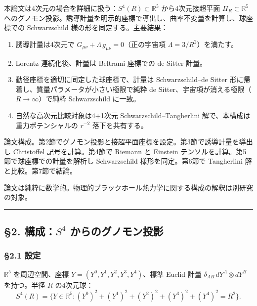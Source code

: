 \documentclass[a4paper,11pt]{ltjsarticle}
\theoremstyle{definition}
\providecommand{\tightlist}{\setlength{\itemsep}{0pt}\setlength{\parskip}{0pt}}
\begin{document}
本論文は4次元の場合を詳細に扱う：\(S^4(R) \subset \mathbb{R}^5\)
から4次元接超平面 \(\Pi_R \subset \mathbb{R}^5\)
へのグノモン投影。誘導計量を明示的座標で導出し、曲率不変量を計算し、球座標での
Schwarzschild 様の形を同定する。主要結果：

\begin{enumerate}
\def\labelenumi{\arabic{enumi}.}
\tightlist
\item
  誘導計量は4次元で
  \(G_{\mu\nu} + \Lambda\, g_{\mu\nu} = 0\)（正の宇宙項
  \(\Lambda = 3/R^2\)）を満たす。
\item
  Lorentz 連続化後、計量は Beltrami 座標での de Sitter 計量。
\item
  動径座標を適切に同定した球座標で、計量は Schwarzschild--de Sitter
  形に帰着し、質量パラメータが小さい極限で純粋 de
  Sitter、宇宙項が消える極限（\(R \to \infty\)）で純粋 Schwarzschild
  に一致。
\item
  自然な高次元比較対象は4+1次元 Schwarzschild--Tangherlini
  解で、本構成は重力ポテンシャルの \(r^{-2}\) 落下を共有する。
\end{enumerate}

論文構成。第2節でグノモン投影と接超平面座標を設定。第3節で誘導計量を導出し
Christoffel 記号を計算。第4節で Riemann と Einstein
テンソルを計算。第5節で球座標での計量を解析し Schwarzschild
様形を同定。第6節で Tangherlini 解と比較。第7節で結論。

論文は純粋に数学的。物理的ブラックホール熱力学に関する構成の解釈は別研究の対象。

\begin{center}\rule{0.5\linewidth}{0.5pt}\end{center}

\subsection{\texorpdfstring{§2. 構成：\(S^4\)
からのグノモン投影}{§2. 構成：S\^{}4 からのグノモン投影}}\label{ux69cbux6210s4-ux304bux3089ux306eux30b0ux30ceux30e2ux30f3ux6295ux5f71}

\subsubsection{§2.1 設定}\label{ux8a2dux5b9a}

\(\mathbb{R}^5\) を周辺空間、座標
\(Y = (Y^0, Y^1, Y^2, Y^3, Y^4)\)、標準 Euclid 計量
\(\delta_{AB}\, dY^A \otimes dY^B\) を持つ。半径 \(R\) の4次元球：
\[S^4(R) = \{Y \in \mathbb{R}^5 : (Y^0)^2 + (Y^1)^2 + (Y^2)^2 + (Y^3)^2 + (Y^4)^2 = R^2\}.\]
\end{document}
